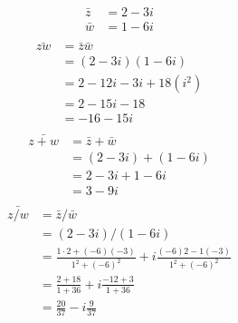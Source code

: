

\begin{align*}
  \bar{z} &= 2-3i\\
  \bar{w} &= 1-6i\\
\end{align*}
\begin{align*}
  \bar{zw}&=\bar{z}\bar{w}\\
          &=(2-3i)(1-6i)\\
          &=2-12i-3i+18(i^2)\\
          &=2-15i-18\\
          &=-16-15i\\
\end{align*}
\begin{align*}
  \bar{z+w} &= \bar{z}+\bar{w}\\
            &= (2-3i) + (1-6i)\\
            &= 2-3i +1-6i\\
            &=3-9i\\
\end{align*}
\begin{align*}
  \bar{z/w} &= \bar{z}/\bar{w}\\
            &= (2-3i)/(1-6i)\\
            &= \frac{1\cdot 2 + (-6)(-3)}{1^2+(-6)^2} + i\frac{(-6)2-1(-3)}{1^2+(-6)^2}\\
            &= \frac{2+ 18}{1+36} + i\frac{-12+3}{1+36}\\
            &= \frac{20}{37} - i\frac{9}{37}\\
\end{align*}




